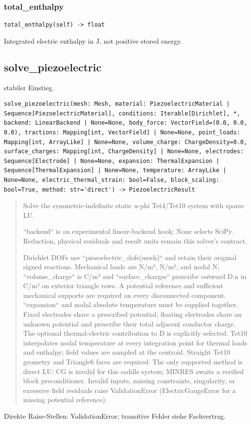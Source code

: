 \subsubsection*{total\_enthalpy}
\begin{lstlisting}
total_enthalpy(self) -> float
\end{lstlisting}
Integrated electric enthalpy in J, not positive stored energy.
\subsection{solve\_piezoelectric}
stabiler Einstieg.
\begin{lstlisting}
solve_piezoelectric(mesh: Mesh, material: PiezoelectricMaterial | Sequence[PiezoelectricMaterial], conditions: Iterable[Dirichlet], *, backend: LinearBackend | None=None, body_force: VectorField=(0.0, 0.0, 0.0), tractions: Mapping[int, VectorField] | None=None, point_loads: Mapping[int, ArrayLike] | None=None, volume_charge: ChargeDensity=0.0, surface_charges: Mapping[int, ChargeDensity] | None=None, electrodes: Sequence[Electrode] | None=None, expansion: ThermalExpansion | Sequence[ThermalExpansion] | None=None, temperature: ArrayLike | None=None, electric_thermal_strain: bool=False, block_scaling: bool=True, method: str='direct') -> PiezoelectricResult
\end{lstlisting}
\begin{quote}
Solve the symmetric-indefinite static u-phi Tet4/Tet10 system with sparse LU.\par ``backend`` is an experimental linear-backend hook; None selects SciPy. Reduction, physical residuals and result units remain this solver's contract.\par Dirichlet DOFs use ``piezoelectric\_dofs(mesh)`` and retain their original signed reactions. Mechanical loads are N/m³, N/m², and nodal N; ``volume\_charge`` is C/m³ and ``surface\_charges`` prescribe outward D.n in C/m² on exterior triangle rows. A potential reference and sufficient mechanical supports are required on every disconnected component. ``expansion`` and nodal absolute temperature must be supplied together. Fixed electrodes share a prescribed potential; floating electrodes share an unknown potential and prescribe their total adjacent conductor charge. The optional thermal-electric contribution to D is explicitly selected. Tet10 interpolates nodal temperature at every integration point for thermal loads and enthalpy; field values are sampled at the centroid. Straight Tet10 geometry and Triangle6 faces are required. The only supported method is direct LU: CG is invalid for this saddle system; MINRES awaits a verified block preconditioner. Invalid inputs, missing constraints, singularity, or excessive field residuals raise ValidationError (ElectricGaugeError for a missing potential reference).
\end{quote}
Direkte Raise-Stellen: ValidationError; transitive Fehler siehe Fachvertrag.
